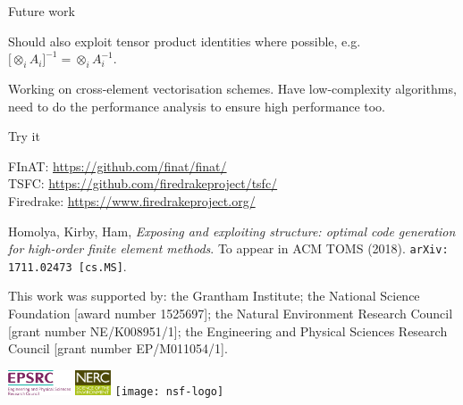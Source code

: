 \documentclass[a0paper,portrait]{baposter}
\begin{document}
\begin{poster}
\begin{posterbox}[name=future, column=0, below=rules,
    span=3]{Future work}
\begin{tcolorbox}[title=Local algebra,left=0mm,right=0mm,top=0mm,bottom=0mm,boxsep=0.5mm,
      valign upper=center]
      Should also exploit tensor product identities where possible,
      e.g.~$\big[\otimes_i A_i\big]^{-1} = \otimes_i A_i^{-1}$.
    \end{tcolorbox}
    \begin{tcolorbox}[title=Vectorisation,left=0mm,right=0mm,top=0mm,bottom=0mm,boxsep=0.5mm,
      valign upper=center]
      Working on cross-element vectorisation schemes.  Have
      low-complexity algorithms, need to do the performance analysis
      to ensure high performance too.
    \end{tcolorbox}
  \end{posterbox}    
  \begin{posterbox}[name=try, column=3, below=curl-curl,
    span=3]{Try it}
    \begin{tcolorbox}[title=Code,left=0mm,right=0mm,top=0mm,bottom=0mm,boxsep=0.5mm,valign upper=center]
    FInAT: \url{https://github.com/finat/finat/}\\
    TSFC: \url{https://github.com/firedrakeproject/tsfc/}\\
    Firedrake: \url{https://www.firedrakeproject.org/}
    \end{tcolorbox}
    \begin{tcolorbox}[title=More
      details,left=0mm,right=0mm,top=0mm,bottom=0mm,boxsep=0.5mm,valign
      upper=center, halign=left]
      Homolya, Kirby, Ham, \emph{Exposing and exploiting structure:
        optimal code generation for high-order finite element
        methods}. To appear in ACM TOMS (2018).
      \texttt{arXiv:\,1711.02473\,[cs.MS]}.
    \end{tcolorbox}
  \end{posterbox}
  \begin{posterbox}[name=acknowledgements,
    column=0,span=6,below=future,
    boxheaderheight=0.75em]{}
    This work was supported by: the Grantham Institute; the National
    Science Foundation [award number 1525697]; the Natural Environment
    Research Council [grant number NE/K008951/1]; the Engineering and
    Physical Sciences Research Council [grant number EP/M011054/1].

    
    \begin{center}
      \includegraphics[height=2em]{epsrc-logo} \hfill
      \includegraphics[height=2em]{nerc-logo} \hfill
      \texttt{[image: nsf-logo]}
    \end{center}
  \end{posterbox}
\end{poster}
\end{document}
